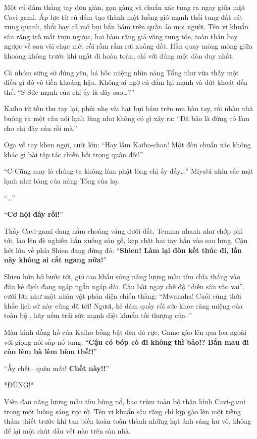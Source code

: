 \documentclass[../main.tex]{subfiles}
\begin{document}
Một cú đấm thẳng tay đơn giản, gọn gàng và chuẩn xác tung ra ngay giữa mặt Cavi-gami. Áp lực từ cú đấm tạo thành một luồng gió mạnh thổi tung đất cát xung quanh, thổi bay cả mớ bụi bẩn bám trên quần áo mọi người. Tên vi khuẩn sâu răng trố mắt trợn ngược, hai hàm răng giả văng tung tóe, toàn thân bay ngược về sau vài chục mét rồi rầm rầm rơi xuống đất. Hắn quay mòng mòng giữa khoảng không trước khi ngất đi hoàn toàn, chỉ với đúng một đòn duy nhất.

Cả nhóm sững sờ đứng yên, há hốc miệng nhìn nàng Tổng như vừa thấy một điều gì đó vô tiền khoáng hậu. Không ai ngờ cú đấm lại mạnh và dứt khoát đến thế. ``S-Sức mạnh của chị ấy là đây sao\dots?''

Kaiho từ tốn thu tay lại, phủi nhẹ vài hạt bụi bám trên mu bàn tay, rồi nhàn nhã buông ra một câu nói lạnh lùng như không có gì xảy ra: ``Đã bảo là đừng có làm cho chị đây cáu rồi mà.''

Oga vỗ tay khen ngợi, cười lớn: ``Hay lắm Kaiho-chan! Một đòn chuẩn xác không khác gì bài tập tác chiến hồi trong quân đội!''

``C-Cũng may là chúng ta không làm phật lòng chị ấy đấy\dots'' Miyabi nhìn sắc mặt lạnh như băng của nàng Tổng của họ.

``\dots''

``\textbf{Cơ hội đây rồi!}''

Thấy Cavi-gami đang nằm choáng váng dưới đất, Temma nhanh như chớp phi tới, lao lên đè nghiến hắn xuống sàn gỗ, kẹp chặt hai tay hắn vào sau lưng. Cậu hét lớn về phía Shien đang đứng đó: ``\textbf{Shien! Làm lại đòn kết thúc đi, lần này không ai cắt ngang nữa!}''

Shien hớn hở bước tới, giơ cao khẩu súng năng lượng màu tím chĩa thẳng vào đầu kẻ địch đang ngáp ngắn ngáp dài. Cậu bật ngay chế độ ``diễn sâu vào vai'', cười lớn như một nhân vật phản diện chiến thắng: ``Mwahaha! Cuối cùng thời khắc lịch sử này cũng đã tới! Ngươi, kẻ dám quấy rối sức khỏe răng miệng của toàn bộ \hls, hãy nếm trải sức mạnh diệt khuẩn tối thượng của--''

Màn hình đồng hồ của Kaiho bỗng bật đèn đỏ rực, Game gào lên qua loa ngoài với giọng nói sắp nổ tung: ``\textbf{Cậu có bóp cò đi không thì bảo!? Bắn mau đi còn lèm bà lèm bèm thế!!}''

``Ấy chết-- quên mất! \textbf{Chết này!!}''

*ĐÙNG!*

Viên đạn năng lượng màu tím bùng nổ, bao trùm toàn bộ thân hình Cavi-gami trong một luồng sáng rực rỡ. Tên vi khuẩn sâu răng chỉ kịp gào lên một tiếng thảm thiết trước khi tan biến hoàn toàn thành những hạt ánh sáng hư vô, không để lại một chút dấu vết nào trên sàn nhà.
\end{document}
